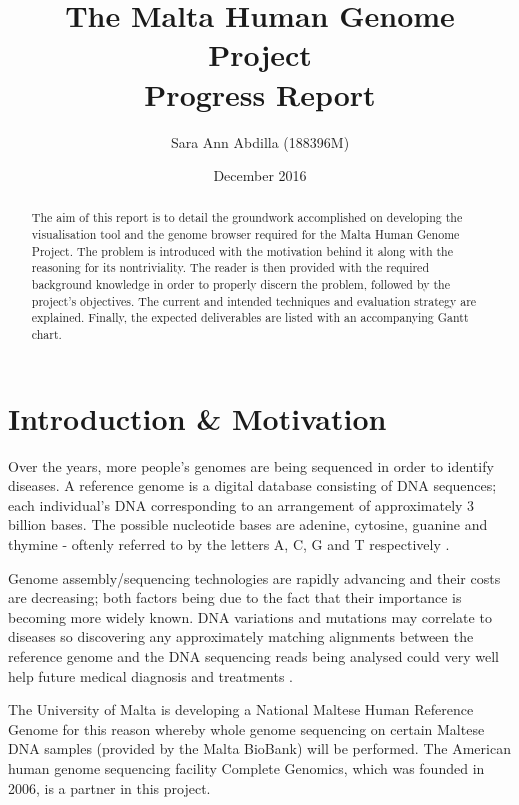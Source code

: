 \documentclass{csfyp}
\title{The Malta Human Genome Project \\
  \large Progress Report}
\author{Sara Ann Abdilla (188396M)}
\date{December 2016}
\begin{document}
\tableofcontents

\newpage

\setcounter{page}{1}


\begin{abstract}
The aim of this report is to detail the groundwork accomplished on developing the visualisation tool and the genome browser required for the Malta Human Genome Project.  The problem is introduced with the motivation behind it along with the reasoning for its nontriviality.  The reader is then provided with the required background knowledge in order to properly discern the problem, followed by the project's objectives.  The current and intended techniques and evaluation strategy are explained.  Finally, the expected deliverables are listed with an accompanying Gantt chart.   
\end{abstract}


\section{Introduction \& Motivation}
\label{s:intro}

Over the years, more people's genomes are being sequenced in order to identify diseases.  A reference genome is a digital database consisting of DNA sequences; each individual's DNA corresponding to an arrangement of approximately 3 billion bases.  The possible nucleotide bases are adenine, cytosine, guanine and thymine - oftenly referred to by the letters A, C, G and T respectively \cite{aiBk, introgenom}.  

Genome assembly/sequencing technologies are rapidly advancing and their costs are decreasing; both factors being due to the fact that their importance is becoming more widely known.  DNA variations and mutations may correlate to diseases so discovering any approximately matching alignments between the reference genome and the DNA sequencing reads being analysed could very well help future medical diagnosis and treatments \cite{think}.

The University of Malta is developing a National Maltese Human Reference Genome for this reason whereby whole genome sequencing on certain Maltese DNA samples (provided by the Malta BioBank) will be performed.  The American human genome sequencing facility Complete Genomics, which was founded in 2006, is a partner in this project. 
\end{document}
